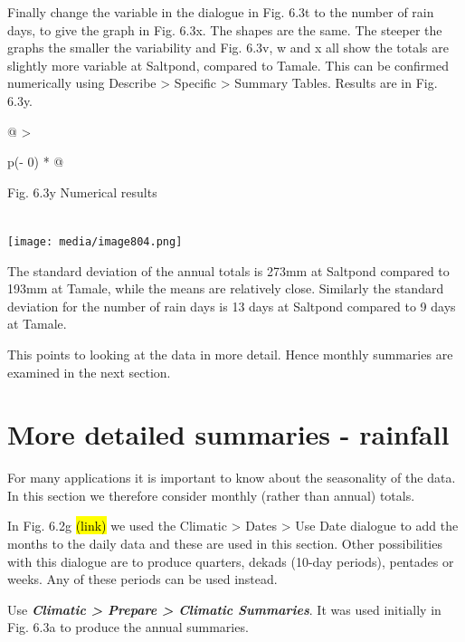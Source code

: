 \documentclass[
  letterpaper,
  DIV=11,
  numbers=noendperiod]{scrreprt}
\begin{document}
Finally change the variable in the dialogue in Fig. 6.3t to the number
of rain days, to give the graph in Fig. 6.3x. The shapes are the same.
The steeper the graphs the smaller the variability and Fig. 6.3v, w and
x all show the totals are slightly more variable at Saltpond, compared
to Tamale. This can be confirmed numerically using Describe
\textgreater{} Specific \textgreater{} Summary Tables. Results are in
Fig. 6.3y.

\begin{longtable}[]{@{}
  >{\raggedright\arraybackslash}p{(\columnwidth - 0\tabcolsep) * }@{}}
\toprule\noalign{}
\begin{minipage}[b]{\linewidth}\raggedright
Fig. 6.3y Numerical results
\end{minipage} \\
\midrule\noalign{}
\endhead
\bottomrule\noalign{}
\endlastfoot
\texttt{[image: media/image804.png]} \\
\end{longtable}

The standard deviation of the annual totals is 273mm at Saltpond
compared to 193mm at Tamale, while the means are relatively close.
Similarly the standard deviation for the number of rain days is 13 days
at Saltpond compared to 9 days at Tamale.

This points to looking at the data in more detail. Hence monthly
summaries are examined in the next section.

\section{More detailed summaries -
rainfall}\label{more-detailed-summaries---rainfall}

For many applications it is important to know about the seasonality of
the data. In this section we therefore consider monthly (rather than
annual) totals.

In Fig. 6.2g \hl{(link)} we used the Climatic \textgreater{} Dates
\textgreater{} Use Date dialogue to add the months to the daily data and
these are used in this section. Other possibilities with this dialogue
are to produce quarters, dekads (10-day periods), pentades or weeks. Any
of these periods can be used instead.

Use \textbf{\emph{Climatic \textgreater{} Prepare \textgreater{}
Climatic Summaries}}. It was used initially in Fig. 6.3a to produce the
annual summaries.
\end{document}
